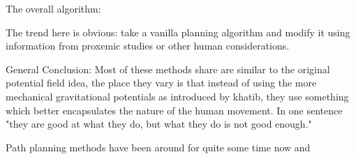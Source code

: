 The overall algorithm:

The trend here is obvious: take a vanilla planning algorithm and modify it using information from proxemic studies or other human considerations.

General Conclusion:
Most of these methods share are similar to the original potential field idea, the place they vary is that instead of using the more mechanical gravitational potentials as introduced by khatib, they use something which better encapsulates the nature of the human movement.
In one sentence "they are good at what they do, but what they do is not good enough."

Path planning methods have been around for quite some time now and 


